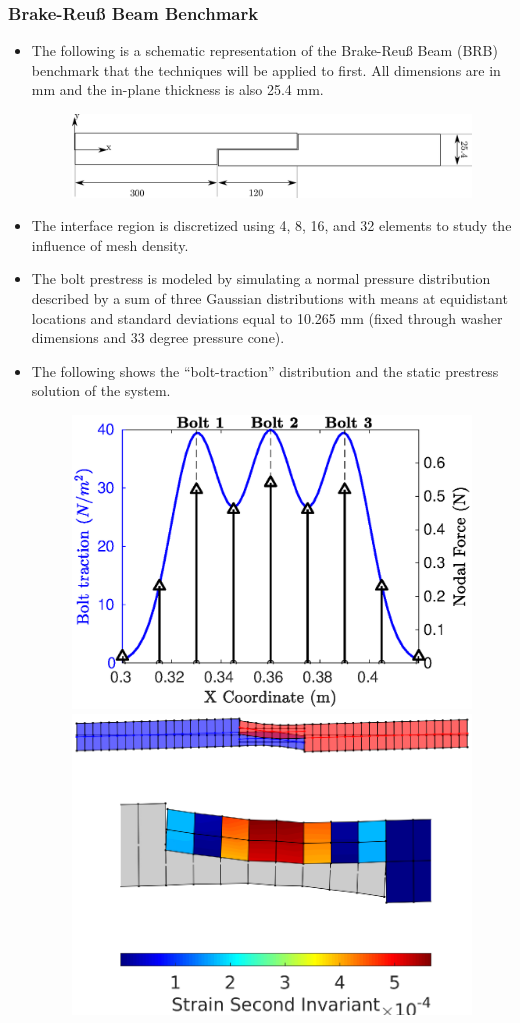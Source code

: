 \documentclass[aspectratio=169]{beamertmd}
\begin{document}
\begin{frame}[allowframebreaks]
  \frametitle{Brake-Reu{\ss} Beam Benchmark}
  \begin{itemize}
  \item The following is a schematic representation of the
    Brake-Reu{\ss} Beam (BRB) benchmark that the techniques will be
    applied to first. All dimensions are in mm and the in-plane
    thickness is also 25.4 mm.
    \begin{figure}[!h]
      \centering
      \includegraphics[width=0.8\linewidth]{../../PLANARMODEL/FIGS/brbdesign}
    \end{figure}
  \item The interface region is discretized using 4, 8, 16, and 32
    elements to study the influence of mesh density.
  \item The bolt prestress is modeled by simulating a normal pressure
    distribution described by a sum of three Gaussian distributions
    with means at equidistant locations and standard deviations
    equal to 10.265 mm (fixed through washer dimensions and 33 degree
    pressure cone).
  \item The following shows the ``bolt-traction'' distribution and the
    static prestress solution of the system.
    \pagebreak
    \begin{figure}[!h]
      \centering
      \includegraphics[width=0.5\linewidth]{../../PLANARMODEL/FIGS/BOLTFORCMOD_8IN}%
      \includegraphics[width=0.5\linewidth]{../../PLANARMODEL/FIGS/8IN_PRESSOL}

\end{figure}
\end{itemize}
\end{frame}
\end{document}
